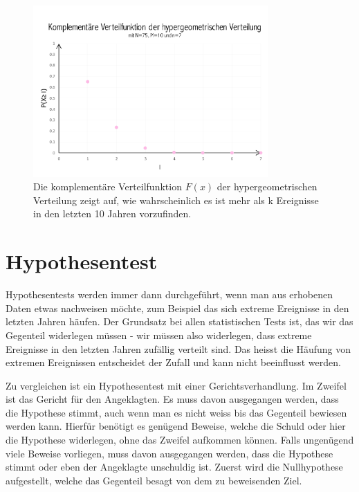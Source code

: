 \begin{refsection}

\begin{figure}
\centering
\includegraphics[width=0.8\textwidth]{extrem/HyperExt.pdf}
\caption{Die komplementäre Verteilfunktion $F(x)$ der hypergeometrischen Verteilung zeigt auf, wie wahrscheinlich es ist mehr als k Ereignisse in den letzten 10 Jahren vorzufinden.}
\label{HyperExt}
\end{figure}




\section{Hypothesentest}
Hypothesentests werden immer dann durchgeführt, wenn man aus erhobenen Daten etwas nachweisen möchte, zum Beispiel das sich extreme Ereignisse in den letzten Jahren häufen. Der Grundsatz bei allen statistischen Tests ist, das wir das Gegenteil widerlegen müssen - wir müssen also widerlegen, dass extreme Ereignisse in den letzten Jahren zufällig verteilt sind. Das heisst die Häufung von extremen Ereignissen entscheidet der Zufall und kann nicht beeinflusst werden.

Zu vergleichen ist ein Hypothesentest mit einer Gerichtsverhandlung. Im Zweifel ist das Gericht für den Angeklagten. Es muss davon ausgegangen werden, dass die Hypothese stimmt, auch wenn man es nicht weiss bis das Gegenteil bewiesen werden kann. Hierfür benötigt es genügend Beweise, welche die Schuld oder hier die Hypothese widerlegen, ohne das Zweifel aufkommen können. Falls ungenügend viele Beweise vorliegen, muss davon ausgegangen werden, dass die Hypothese stimmt oder eben der Angeklagte unschuldig ist.
Zuerst wird die Nullhypothese aufgestellt, welche das Gegenteil besagt von dem zu beweisenden Ziel.


\end{refsection}
